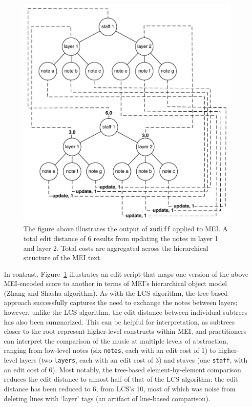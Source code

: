 \documentclass{article}
\newcommand{\code}[1]{\texttt{#1}}
\begin{document}
\begin{figure}[h]
\centering
\includegraphics[width=\columnwidth]{figures/hierarchical-diff.pdf}
\caption{The figure above illustrates the output of \code{xudiff}
  applied to MEI.  A total edit distance of 6 results from updating
  the notes in layer 1 and layer 2.  Total costs are aggregated across
the hierarchical structure of the MEI text.}
\label{fig:hierarchical-diff}
\end{figure}

In contrast, Figure~\ref{fig:hierarchical-diff} illustrates an edit
script that maps one version of the above MEI-encoded score to another
in terms of MEI's hierarchical object model (Zhang and Shasha algorithm).  As with the LCS
algorithm, the tree-based approach successfully captures the need to
exchange the notes between layers; however, unlike the LCS algorithm, the edit distance between individual subtrees has also been
summarized.  This can be helpful for interpretation, as subtrees closer
to the root represent higher-level constructs within MEI, and practitioners can interpret the comparison of the music at multiple levels 
of abstraction, ranging from low-level notes (six \code{notes}, each with an edit cost of 1) 
to higher-level layers (two \code{layers}, each with an edit cost of 3) and staves (one \code{staff}, 
with an edit cost of 6). Most notably, the tree-based element-by-element comparison reduces the edit distance to almost half of that of the LCS algorithm: the edit distance has been reduced to 6, from LCS's 10, most of which was noise from deleting lines with `layer' tags (an artifact of line-based comparison).
\end{document}
